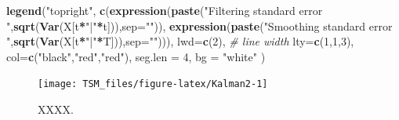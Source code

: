 \documentclass[
  12pt,
]{book}
\newenvironment{Shaded}{\begin{snugshade}}{\end{snugshade}}
\newcommand{\AttributeTok}[1]{\textcolor[rgb]{0.13,0.29,0.53}{#1}}
\newcommand{\CommentTok}[1]{\textcolor[rgb]{0.56,0.35,0.01}{\textit{#1}}}
\newcommand{\DecValTok}[1]{\textcolor[rgb]{0.00,0.00,0.81}{#1}}
\newcommand{\FunctionTok}[1]{\textcolor[rgb]{0.13,0.29,0.53}{\textbf{#1}}}
\newcommand{\NormalTok}[1]{#1}
\newcommand{\SpecialCharTok}[1]{\textcolor[rgb]{0.81,0.36,0.00}{\textbf{#1}}}
\newcommand{\StringTok}[1]{\textcolor[rgb]{0.31,0.60,0.02}{#1}}
\theoremstyle{definition}
\theoremstyle{definition}
\theoremstyle{definition}
\theoremstyle{definition}
\theoremstyle{remark}
\begin{document}
\begin{Shaded}
\begin{Highlighting}[]
\FunctionTok{legend}\NormalTok{(}\StringTok{"topright"}\NormalTok{,}
       \FunctionTok{c}\NormalTok{(}\FunctionTok{expression}\NormalTok{(}\FunctionTok{paste}\NormalTok{(}\StringTok{"Filtering standard error "}\NormalTok{,}\FunctionTok{sqrt}\NormalTok{(}\FunctionTok{Var}\NormalTok{(X[t}\SpecialCharTok{*}\StringTok{"|"}\SpecialCharTok{*}\NormalTok{t])),}\AttributeTok{sep=}\StringTok{""}\NormalTok{)),}
         \FunctionTok{expression}\NormalTok{(}\FunctionTok{paste}\NormalTok{(}\StringTok{"Smoothing standard error "}\NormalTok{,}\FunctionTok{sqrt}\NormalTok{(}\FunctionTok{Var}\NormalTok{(X[t}\SpecialCharTok{*}\StringTok{"|"}\SpecialCharTok{*}\NormalTok{T])),}\AttributeTok{sep=}\StringTok{""}\NormalTok{))),}
       \AttributeTok{lwd=}\FunctionTok{c}\NormalTok{(}\DecValTok{2}\NormalTok{), }\CommentTok{\# line width}
       \AttributeTok{lty=}\FunctionTok{c}\NormalTok{(}\DecValTok{1}\NormalTok{,}\DecValTok{1}\NormalTok{,}\DecValTok{3}\NormalTok{),}
       \AttributeTok{col=}\FunctionTok{c}\NormalTok{(}\StringTok{"black"}\NormalTok{,}\StringTok{"red"}\NormalTok{,}\StringTok{"red"}\NormalTok{),}
       \AttributeTok{seg.len =} \DecValTok{4}\NormalTok{,}
       \AttributeTok{bg =} \StringTok{"white"}
\NormalTok{)}
\end{Highlighting}
\end{Shaded}

\begin{figure}
\texttt{[image: TSM\_files/figure-latex/Kalman2-1]} \caption{XXXX.}\label{fig:Kalman2}
\end{figure}
\end{document}
